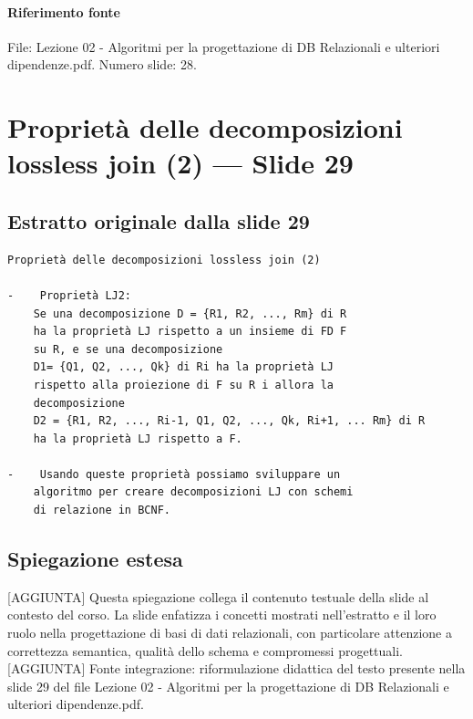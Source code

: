\documentclass[11pt]{article}
\begin{document}
\paragraph{Riferimento fonte} File: Lezione 02 - Algoritmi per la progettazione di DB Relazionali e ulteriori dipendenze.pdf. Numero slide: 28.
\section{Proprietà delle decomposizioni lossless join (2) --- Slide 29}
\subsection*{Estratto originale dalla slide 29}
\begin{lstlisting}
Proprietà delle decomposizioni lossless join (2)

-    Proprietà LJ2:
    Se una decomposizione D = {R1, R2, ..., Rm} di R
    ha la proprietà LJ rispetto a un insieme di FD F
    su R, e se una decomposizione
    D1= {Q1, Q2, ..., Qk} di Ri ha la proprietà LJ
    rispetto alla proiezione di F su R i allora la
    decomposizione
    D2 = {R1, R2, ..., Ri-1, Q1, Q2, ..., Qk, Ri+1, ... Rm} di R
    ha la proprietà LJ rispetto a F.

-    Usando queste proprietà possiamo sviluppare un
    algoritmo per creare decomposizioni LJ con schemi
    di relazione in BCNF.
\end{lstlisting}
\subsection*{Spiegazione estesa}
[AGGIUNTA] Questa spiegazione collega il contenuto testuale della slide al contesto del corso. La slide enfatizza i concetti mostrati nell'estratto e il loro ruolo nella progettazione di basi di dati relazionali, con particolare attenzione a correttezza semantica, qualità dello schema e compromessi progettuali.
[AGGIUNTA] Fonte integrazione: riformulazione didattica del testo presente nella slide 29 del file Lezione 02 - Algoritmi per la progettazione di DB Relazionali e ulteriori dipendenze.pdf.
\end{document}
